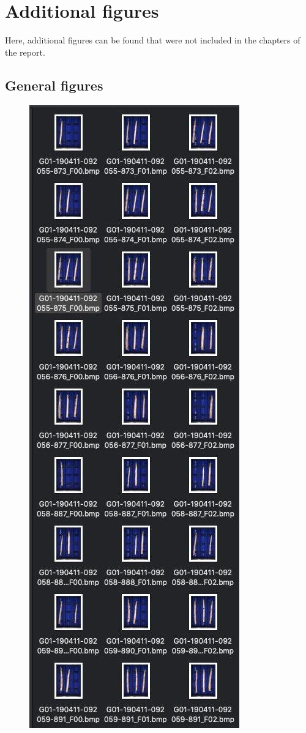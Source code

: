 
\section{Additional figures}
\label{apx:AdditionalFigures}

Here, additional figures can be found that were not included in the chapters of the report.

\subsection{General figures}
\label{sec:General}
\begin{figure}[h]
	\centering
	\includegraphics[scale=0.4]{Figures/appendix/original_files_naming_conventions.png}

\end{figure}

